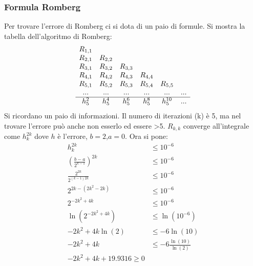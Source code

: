 \documentclass[11pt]{article}
\begin{document}
\subsubsection{Formula Romberg}
%	
Per trovare l'errore di Romberg ci si dota di un paio di formule. Si mostra la tabella dell'algoritmo di Romberg:
\[
\begin{array}{ c c c c c c }
	R_{1,1} 			\\
 R_{2,1}	&	R_{2,2} 	\\
 R_{3,1}	&	R_{3,2} & R_{3,3} 	\\  
  R_{4,1}	&	R_{4,2} & R_{4,3} & R_{4,4}  	\\
  R_{5,1}	&	R_{5,2} & R_{5,3} & R_{5,4} & R_{5,5} 	\\
  ... & ... & ... & ... & ... & ...\\
  \hline
  h_5^2 & h_5^4 & h_5^6 & h_5^8 & h_5^{10} & ... \\
 \end{array}
\]
Si ricordano un paio di informazioni. Il numero di iterazioni (k) è 5, ma nel trovare l'errore può anche non esserlo ed essere >5.  $R_{k,k}$ converge all’integrale come $h_k^{2k}$ dove $h$ è l'errore, $b=2$,$a=0$. Ora si pone:
\begin{align*}
h_k^{2k}&\leq 10^{-6} \\
\left(\frac{b-a}{2^{k-1}}\right)^{2k} &\leq 10^{-6}\\
\frac{2^{2k}}{2^{(k-1)2k}} &\leq 10^{-6}\\
2^{2k-(2k^2-2k)}&\leq 10^{-6}\\
2^{-2k^2+4k}&\leq 10^{-6}\\
\ln(2^{-2k^2+4k})&\leq\ln(10^{-6})\\
-2k^2+4k\ln(2)&\leq-6\ln(10)\\
-2k^2+4k&\leq -6\frac{\ln(10)}{\ln(2)}\\
-2k^2+4k+ 19.9316\geq0 \\
\end{align*}
\end{document}
